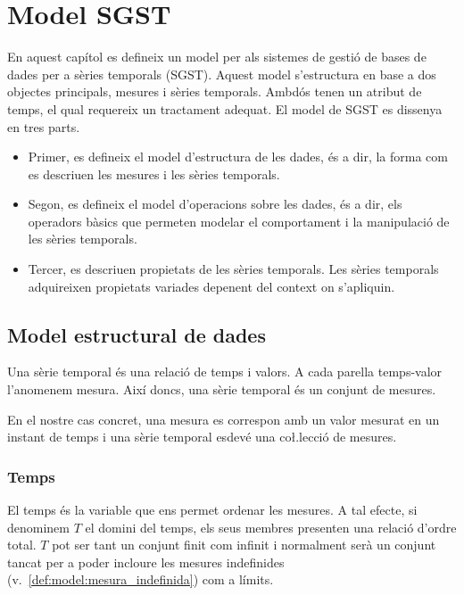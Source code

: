 
\chapter{Model SGST}
\label{cap:model:sgst}


En aquest capítol es defineix un model per als sistemes de gestió de
bases de dades per a sèries temporals (SGST). Aquest model
s'estructura en base a dos objectes principals, mesures i sèries temporals.
Ambdós tenen un atribut de temps, el qual requereix un tractament
adequat. El model de SGST es dissenya en tres parts.

\begin{itemize}

\item Primer, es defineix el model d'estructura de les dades, és a
  dir, la forma com es descriuen les mesures i les sèries temporals.  

\item Segon, es defineix el model d'operacions sobre les dades, és a
  dir, els operadors bàsics que permeten modelar el comportament i la
  manipulació de les sèries temporals.

\item Tercer, es descriuen propietats de les sèries
  temporals. Les sèries temporals adquireixen propietats
  variades depenent del context on s'apliquin.

\end{itemize}





\section{Model estructural de dades}

Una sèrie temporal és una relació de temps i valors. A cada parella
temps-valor l'anomenem mesura. Així doncs, una sèrie temporal és un
conjunt de mesures. 


En el nostre cas concret, una mesura es correspon amb un valor mesurat
en un instant de temps i una sèrie temporal esdevé una co\l.lecció de
mesures.





\subsection{Temps}
\label{sec:sgst:temps}

El temps és la variable que ens permet ordenar les mesures.  A tal
efecte, si denominem $T$ el domini del temps, els seus membres
presenten una relació d'ordre total. $T$ pot ser tant un conjunt finit
com infinit i normalment serà un conjunt tancat %
per a poder incloure les mesures indefinides (v.\
\autoref{def:model:mesura_indefinida}) com a límits.


